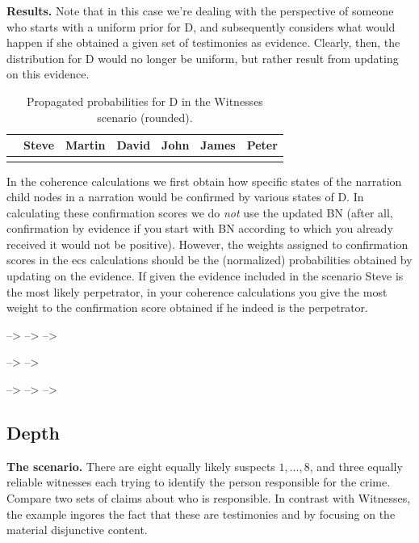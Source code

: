 \documentclass[
  10pt,
]{scrartcl}
\newcommand{\s}[1]{\textsf{#1}}
\begin{document}
\textbf{Results.} Note that in this case we're dealing with the perspective of someone who starts with a uniform prior for \s{D}, and subsequently considers what would happen if she obtained a given set of testimonies as evidence. Clearly, then, the distribution for \s{D} would no longer be uniform, but rather result from updating on this evidence.

\begin{table}[H]

\caption{\label{tab:witnessesWeights}Propagated probabilities for D in the Witnesses scenario (rounded).}
\centering
\begin{tabular}[t]{lrrrrrr}
\toprule
  & Steve & Martin & David & John & James & Peter\\
\midrule
\cellcolor{gray!6}{Pr} & \cellcolor{gray!6}{0.981} & \cellcolor{gray!6}{0.004} & \cellcolor{gray!6}{0.004} & \cellcolor{gray!6}{0.004} & \cellcolor{gray!6}{0.004} & \cellcolor{gray!6}{0.004}\\
\bottomrule
\end{tabular}
\end{table}

In the coherence calculations we first obtain how specific states of the narration child nodes in a narration would be confirmed by various states of \s{D}. In calculating these confirmation scores we do \emph{not} use the updated BN (after all, confirmation by evidence if you start with BN according to which you already received it would not be positive). However, the weights assigned to confirmation scores in the \s{ecs} calculations should be the (normalized) probabilities obtained by updating on the evidence. If given the evidence included in the scenario Steve is the most likely perpetrator, in your coherence calculations you give the most weight to the confirmation score obtained if he indeed is the perpetrator.

--\textgreater{}
--\textgreater{}
--\textgreater{}

--\textgreater{}
--\textgreater{}

--\textgreater{}
--\textgreater{}
--\textgreater{}

\hypertarget{depth}{%
\subsection{Depth}\label{depth}}


\textbf{The scenario.} There are eight equally likely suspects \(1, \dots, 8\), and three equally reliable witnesses each trying to identify the person responsible for the crime. Compare two sets of claims about who is responsible. In contrast with Witnesses, the example ingores the fact that these are testimonies and by focusing on the material disjunctive content.
\end{document}
